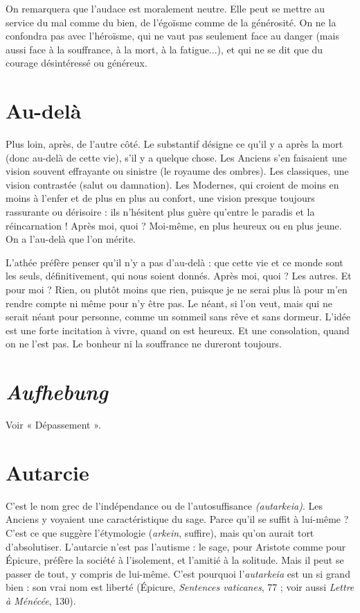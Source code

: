 On remarquera que l’audace est moralement neutre. Elle peut se mettre au
service du mal comme du bien, de l’égoïsme comme de la générosité. On ne la
confondra pas avec l’héroïsme, qui ne vaut pas seulement face au danger (mais
aussi face à la souffrance, à la mort, à la fatigue...), et qui ne se dit que du courage
désintéressé ou généreux.

\section{Au-delà}
Plus loin, après, de l’autre côté. Le substantif désigne ce qu’il y a
après la mort (donc au-delà de cette vie), s’il y a quelque chose.
Les Anciens s’en faisaient une vision souvent effrayante ou sinistre (le royaume
des ombres). Les classiques, une vision contrastée (salut ou damnation). Les
Modernes, qui croient de moins en moins à l’enfer et de plus en plus au
confort, une vision presque toujours rassurante ou dérisoire : ils n’hésitent plus
guère qu'entre le paradis et la réincarnation ! Après moi, quoi ? Moi-même, en
plus heureux ou en plus jeune. On a l'au-delà que l’on mérite.

L’athée préfère penser qu’il n’y a pas d’au-delà : que cette vie et ce monde
sont les seuls, définitivement, qui nous soient donnés. Après moi, quoi ? Les
autres. Et pour moi ? Rien, ou plutôt moins que rien, puisque je ne serai plus
là pour m’en rendre compte ni même pour n’y être pas. Le néant, si l’on veut,
mais qui ne serait néant pour personne, comme un sommeil sans rêve et sans
dormeur. L'idée est une forte incitation à vivre, quand on est heureux. Et une
consolation, quand on ne l’est pas. Le bonheur ni la souffrance ne dureront
toujours.

\section{\it Aufhebung}
Voir « Dépassement ».

\section{Autarcie}
C'est le nom grec de l’indépendance ou de l’autosuffisance {\it (autarkeia)}.
Les Anciens y voyaient une caractéristique du sage. Parce
qu’il se suffit à lui-même ? C’est ce que suggère l’étymologie ({\it arkein}, suffire),
mais qu’on aurait tort d’absolutiser. L’autarcie n’est pas l’autisme : le sage, pour
Aristote comme pour Épicure, préfère la société à l’isolement, et l’amitié à la
solitude. Mais il peut se passer de tout, y compris de lui-même. C’est pourquoi
l’{\it autarkeia} est un si grand bien : son vrai nom est liberté (Épicure, {\it Sentences
vaticanes}, 77 ; voir aussi {\it Lettre à Ménécée}, 130).

